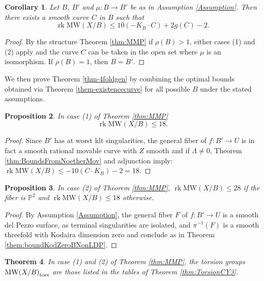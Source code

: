 \documentclass[11pt]{amsart}
\newtheorem{theorem}{Theorem}[section]
\newtheorem{proposition}[theorem]{Proposition}
\newtheorem{corollary}[theorem]{Corollary}
\theoremstyle{definition}
\theoremstyle{definition}
\theoremstyle{remark}
\theoremstyle{remark}
\theoremstyle{definition}
\theoremstyle{conjecture}
\newcommand{\MW}{\mathrm{MW}}
\begin{document}
\begin{corollary} \label{coroll-ConB} Let $B$, $B'$ and $\mu: B \to B'$ be  as in Assumption \ref{Assumption}. Then there exists a smooth curve $C$ in $B$ such that 
    \[
	\operatorname{rk} \MW(X/B) \leq 10 (-K_B \cdot C ) +2 g(C) -2.
	\]
\end{corollary}
\begin{proof} By the structure Theorem \ref{thm:MMP}  if $\rho (B) >1$, either cases (1) and (2) apply and the curve $C$ can be taken in the open set where $\mu$ is an isomorphism. If $\rho(B)=1$, then $B= B'$. \end{proof}
We then  prove {Theorem \ref{thm-4foldgen} 
 by combining the optimal bounds obtained via Theorem \ref{them-existencecurve}  for all possible $B$ under the stated assumptions.}

\begin{proposition}\label{prop:4foldsMoriFib1}
 In case (1)  of  Theorem \ref{thm:MMP}
	\[
	\operatorname{rk} \MW(X/B) \leq 18.
	\]
\end{proposition}

\begin{proof}	Since $B'$ has at worst klt singularities, the general fiber of $f: B' \to U $ is in fact a smooth rational movable curve with $Z$ smooth and
	if  $\Lambda \neq 0$,  Theorem \ref{thm:BoundsFromNoetherMov}  and adjunction imply: $\operatorname{rk} \MW(X/B) \leq - 10 (C  \cdot K_B)  -2= 18.$ \end{proof}

    
    
\begin{proposition}\label{prop:4foldsMoriFib2} In case (2)  of  Theorem \ref{thm:MMP},
$\operatorname{rk} \MW(X/B) \leq 28$ if the  fiber is $\mathbb{P}^2$ and 
$\operatorname{rk}\MW(X/B) \leq 18$  otherwise.
\end{proposition}

\begin{proof}  By Assumption \ref{Assumption}, the  general fiber  $F$ of $f: B' \to U $ is a smooth del Pezzo surface, as terminal singularities are isolated, and $\pi^{-1}(F) $ is a smooth threefold with    Kodaira dimension zero and conclude as in  Theorem \ref{them:boundKodZeroBNonLDP}. \end{proof}



 \begin{theorem}\label{thm:TorsionCY4} In case (1) and (2)  of  Theorem \ref{thm:MMP}, the torsion groups  ${\MW(X/B)}_{\rm tors}$ are  those listed  in  the tables of Theorem \ref{thm:TorsionCY3}.
 \end{theorem}
\end{document}
